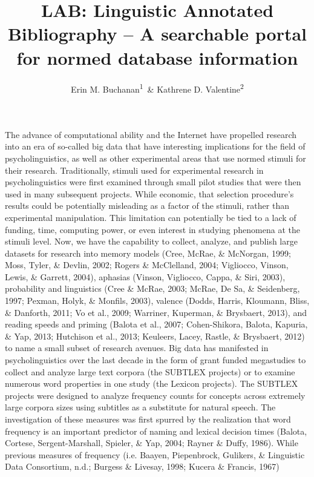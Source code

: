 \documentclass[english,man]{apa6}
\title{LAB: Linguistic Annotated Bibliography -- A searchable portal for normed
database information}
\author{Erin M. Buchanan\textsuperscript{1}~\& Kathrene D. Valentine\textsuperscript{2}}
\affiliation{
    \vspace{0.5cm}
          \textsuperscript{1} Missouri State University\\
          \textsuperscript{2} University of Missouri  }
\theoremstyle{definition}
\theoremstyle{definition}
\theoremstyle{definition}
\theoremstyle{remark}
\begin{document}
\maketitle

\setcounter{secnumdepth}{0}



The advance of computational ability and the Internet have propelled
research into an era of so-called big data that have interesting
implications for the field of psycholinguistics, as well as other
experimental areas that use normed stimuli for their research.
Traditionally, stimuli used for experimental research in
psycholinguistics were first examined through small pilot studies that
were then used in many subsequent projects. While economic, that
selection procedure's results could be potentially misleading as a
factor of the stimuli, rather than experimental manipulation. This
limitation can potentially be tied to a lack of funding, time, computing
power, or even interest in studying phenomena at the stimuli level. Now,
we have the capability to collect, analyze, and publish large datasets
for research into memory models (Cree, McRae, \& McNorgan, 1999; Moss,
Tyler, \& Devlin, 2002; Rogers \& McClelland, 2004; Vigliocco, Vinson,
Lewis, \& Garrett, 2004), aphasias (Vinson, Vigliocco, Cappa, \& Siri,
2003), probability and linguistics (Cree \& McRae, 2003; McRae, De Sa,
\& Seidenberg, 1997; Pexman, Holyk, \& Monfils, 2003), valence (Dodds,
Harris, Kloumann, Bliss, \& Danforth, 2011; Vo et al., 2009; Warriner,
Kuperman, \& Brysbaert, 2013), and reading speeds and priming (Balota et
al., 2007; Cohen-Shikora, Balota, Kapuria, \& Yap, 2013; Hutchison et
al., 2013; Keuleers, Lacey, Rastle, \& Brysbaert, 2012) to name a small
subset of research avenues. Big data has manifested in psycholinguistics
over the last decade in the form of grant funded megastudies to collect
and analyze large text corpora (the SUBTLEX projects) or to examine
numerous word properties in one study (the Lexicon projects). The
SUBTLEX projects were designed to analyze frequency counts for concepts
across extremely large corpora sizes using subtitles as a substitute for
natural speech. The investigation of these measures was first spurred by
the realization that word frequency is an important predictor of naming
and lexical decision times (Balota, Cortese, Sergent-Marshall, Spieler,
\& Yap, 2004; Rayner \& Duffy, 1986). While previous measures of
frequency (i.e. Baayen, Piepenbrock, Gulikers, \& Linguistic Data
Consortium, n.d.; Burgess \& Livesay, 1998; Kucera \& Francis, 1967)
\end{document}
